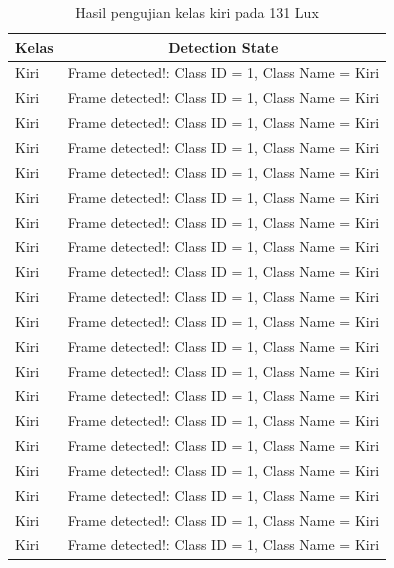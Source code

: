 \begin{longtable}{|l|c|}
  \caption{Hasil pengujian kelas kiri pada 131 Lux}
  \label{tb:lux131kiri} \\
  \hline
  \rowcolor[HTML]{C0C0C0} 
  \textbf{Kelas} & \textbf{Detection State}                           \\ \hline
  Kiri           & Frame detected!: Class ID = 1, Class Name = Kiri \\ \hline
  Kiri           & Frame detected!: Class ID = 1, Class Name = Kiri \\ \hline
  Kiri           & Frame detected!: Class ID = 1, Class Name = Kiri \\ \hline
  Kiri           & Frame detected!: Class ID = 1, Class Name = Kiri \\ \hline
  Kiri           & Frame detected!: Class ID = 1, Class Name = Kiri \\ \hline
  Kiri           & Frame detected!: Class ID = 1, Class Name = Kiri \\ \hline
  Kiri           & Frame detected!: Class ID = 1, Class Name = Kiri \\ \hline
  Kiri           & Frame detected!: Class ID = 1, Class Name = Kiri \\ \hline
  Kiri           & Frame detected!: Class ID = 1, Class Name = Kiri \\ \hline
  Kiri           & Frame detected!: Class ID = 1, Class Name = Kiri \\ \hline
  Kiri           & Frame detected!: Class ID = 1, Class Name = Kiri \\ \hline
  Kiri           & Frame detected!: Class ID = 1, Class Name = Kiri \\ \hline
  Kiri           & Frame detected!: Class ID = 1, Class Name = Kiri \\ \hline
  Kiri           & Frame detected!: Class ID = 1, Class Name = Kiri \\ \hline
  Kiri           & Frame detected!: Class ID = 1, Class Name = Kiri \\ \hline
  Kiri           & Frame detected!: Class ID = 1, Class Name = Kiri \\ \hline
  Kiri           & Frame detected!: Class ID = 1, Class Name = Kiri \\ \hline
  Kiri           & Frame detected!: Class ID = 1, Class Name = Kiri \\ \hline
  Kiri           & Frame detected!: Class ID = 1, Class Name = Kiri \\ \hline
  Kiri           & Frame detected!: Class ID = 1, Class Name = Kiri \\ \hline

\end{longtable}
